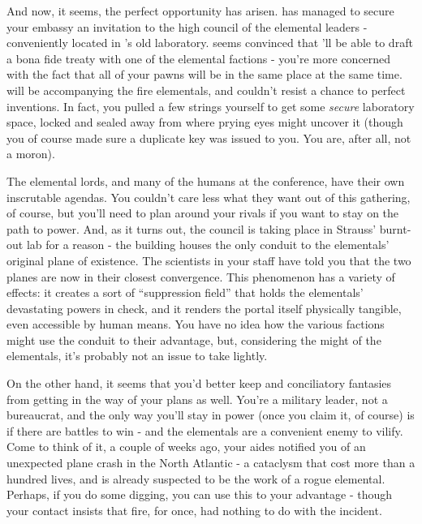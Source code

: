\documentclass[char]{elementals}
\begin{document}
And now, it seems, the perfect opportunity has arisen. \cLeader{} has managed to secure your embassy an invitation to the high council of the elemental leaders - conveniently located in \cGrandfather{}'s old laboratory. \cLeader{} seems convinced that \cLeader{\they}'ll be able to draft a bona fide treaty with one of the elemental factions - you're more concerned with the fact that all of your pawns will be in the same place at the same time. \cPyro{} will be accompanying the fire elementals, and \cMS{} couldn't resist a chance to perfect \cMS{\their} inventions. In fact, you pulled a few strings yourself to get \cMS{\them} some \emph{secure} laboratory space, locked and sealed away from where prying eyes might uncover it (though you of course made sure a duplicate key was issued to you. You are, after all, not a moron). 

The elemental lords, and many of the humans at the conference, have their own inscrutable agendas. You couldn't care less what they want out of this gathering, of course, but you'll need to plan around your rivals if you want to stay on the path to power. And, as it turns out, the council is taking place in Strauss' burnt-out lab for a reason - the building houses the only conduit to the elementals' original plane of existence. The scientists in your staff have told you that the two planes are now in their closest convergence. This phenomenon has a variety of effects: it creates a sort of ``suppression field'' that holds the elementals' devastating powers in check, and it renders the portal itself physically tangible, even accessible by human means. You have no idea how the various factions might use the conduit to their advantage, but, considering the might of the elementals, it's probably not an issue to take lightly.

On the other hand, it seems that you'd better keep \cLeader{} and \cLeader{\their} conciliatory fantasies from getting in the way of your plans as well. You're a military leader, not a bureaucrat, and the only way you'll stay in power (once you claim it, of course) is if there are battles to win - and the elementals are a convenient enemy to vilify. Come to think of it, a couple of weeks ago, your aides notified you of an unexpected plane crash in the North Atlantic - a cataclysm that cost more than a hundred lives, and is already suspected to be the work of a rogue elemental. Perhaps, if you do some digging, you can use this to your advantage - though your contact \cPyro{} insists that fire, for once, had nothing to do with the incident.
\end{document}
